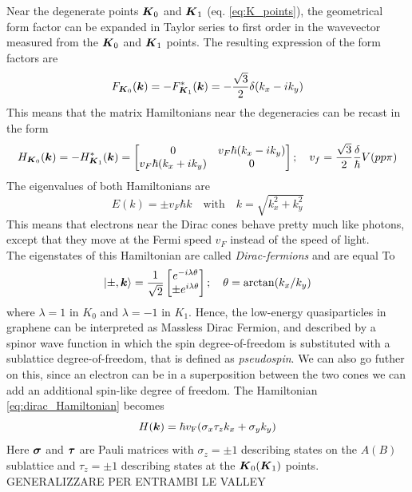 Near the degenerate points $\boldsymbol{K}_0$ and $\boldsymbol{K}_1$ (eq. \ref{eq:K_points}), the geometrical form factor can be expanded in Taylor series to first order in the wavevector measured from the $\boldsymbol{K}_0$ and $\boldsymbol{K}_1$ points. The resulting expression of the form factors are
\begin{equation}
    F_{\boldsymbol{K}_0}(\boldsymbol{k})=-F^*_{\boldsymbol{K}_1}(\boldsymbol{k})= -\frac{\sqrt 3}2 \delta (k_x-ik_y)
    \label{eq:F(k)-approx}
\end{equation}
This means that the matrix Hamiltonians near the degeneracies can be recast in the form
\begin{equation}
    H_{\boldsymbol{K}_0}(\boldsymbol{k})=
    -H^*_{\boldsymbol{K}_1}(\boldsymbol{k})=
    \begin{bmatrix}
        0&v_F\hbar(k_x-ik_y)\\
        v_F\hbar(k_x+ik_y)&0
    \end{bmatrix};\quad
    v_f=\frac{\sqrt 3}2 \frac\delta \hbar V(pp\pi)
    \label{eq:dirac_Hamiltonian}
\end{equation}
The eigenvalues of both Hamiltonians are 
\begin{equation}
    E(k)=\pm v_F\hbar k \quad\text{with}\quad k=\sqrt{k_x^2+k_y^2}
\end{equation}
This means that electrons near the Dirac cones behave pretty much like photons, except that they move at the Fermi speed $v_F$ instead of the speed of light.\\
The eigenstates of this Hamiltonian are called \textit{Dirac-fermions} and are equal To
\begin{equation}
    \ket{\pm,\boldsymbol{k}}=\frac 1{\sqrt 2}
    \begin{bmatrix}
        e^{-i\lambda\theta}\\
        \pm e^{i\lambda\theta}
    \end{bmatrix};\quad \theta=\arctan(k_x/k_y)
\end{equation}
where $\lambda=1$ in $K_0$ and $\lambda=-1$ in $K_1$. Hence, the low-energy quasiparticles in graphene can be interpreted as Massless Dirac Fermion, and described by a spinor wave function in which the spin degree-of-freedom is substituted with a sublattice degree-of-freedom, that is defined as \textit{pseudospin}.
We can also go futher on this, since an electron can be in a superposition between the two cones we can add an additional spin-like degree of freedom. The Hamiltonian \ref{eq:dirac_Hamiltonian} becomes
\begin{equation}
    H(\boldsymbol{k})=\hbar v_\textrm{F}(\sigma_x\tau_zk_x+\sigma_yk_y)
    \label{eq:dirac_Hamiltonian_compressed}
\end{equation}
Here $\boldsymbol{\sigma}$ and $\boldsymbol{\tau}$ are Pauli matrices with $\sigma_z=\pm 1$ describing states on the $A(B)$ sublattice and $\tau_z=\pm 1$ describing states at the $\boldsymbol{K}_0(\boldsymbol{K}_1)$ points.
 GENERALIZZARE PER ENTRAMBI LE VALLEY
